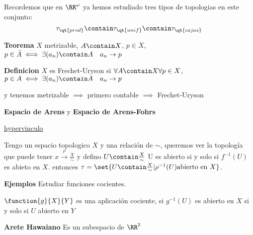 Recordemos que en $ \RR^\omega $ ya hemos estudiado tres tipos de topologias en este conjunto:
\[ \tau_{\qt{prod}} \contain \tau_{\qt{unif}} \contain \tau_{\qt{cajas}} \]

\textbf{Teorema} $ X $ metrizable, $ A \contain X $,  $ p \in X $, $ p \in \bar{A}  \iff \exists(a_n) \contain A \quad a_n \rightarrow p$

\textbf{Definicion } $ X $ es Frechet-Uryson si $ \forall A \contain X  \forall p \in X$, $ p \in A \iff \exists(a_n) \contain A \quad a_n \rightarrow p $

y tenemos metrizable $ \implies $ primero contable $ \implies $ Frechet-Uryson

\textbf{Espacio de Arens} y \textbf{Espacio de Arens-Fohrs}

\href{https://dantopology.wordpress.com/2010/08/18/a-note-about-the-arens-space/	}{hypervinculo}

Tengo un espacio topologico $ X $ y una relación de $ \sim $, queremos ver la topología que puede tener $ x \overset{\rho}{\rightarrow} \frac{X}{\sim}$ y defino $ U \contain \frac{X}{\sim} $ U es abierto si y solo si $ f^{-1}(U) $ es abieto en $ X $. entonces $ \tau = \set{U \contain \frac{X}{\sim} | \rho^{-1}(U) \textrm{abierto en } X} $.
	
\textbf{Ejemplos}
Estudiar funciones cocientes.
\begin{define}
	$ \function{g}{X}{Y} $ es una aplicación cociente, si $ g^{-1}(U) $ es abierto en $X$ si y solo si $ U $ abierto en $Y$
\end{define}

\textbf{Arete Hawaiano} Es un subespacio de $ \RR^2 $